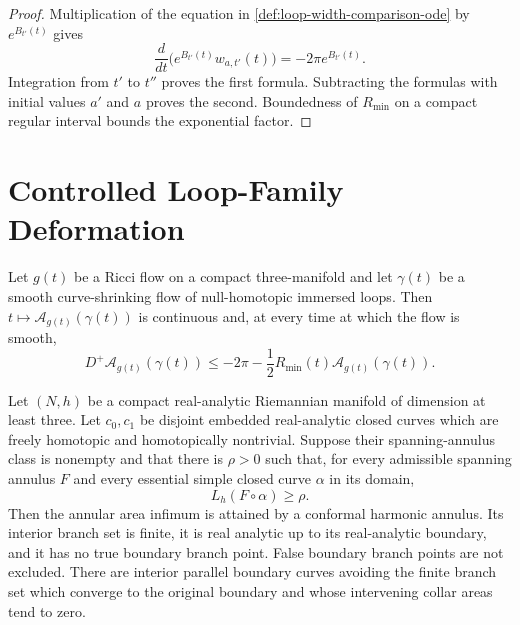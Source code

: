 \begin{proof}
Multiplication of the equation in \ref{def:loop-width-comparison-ode} by
$e^{B_{t'}(t)}$ gives
\[
 \frac d{dt}\bigl(e^{B_{t'}(t)}w_{a,t'}(t)\bigr)
 =-2\pi e^{B_{t'}(t)}.
\]
Integration from $t'$ to $t''$ proves the first formula.  Subtracting the
formulas with initial values $a'$ and $a$ proves the second.  Boundedness of
$R_{\min}$ on a compact regular interval bounds the exponential factor.
\end{proof}
\section{Controlled Loop-Family Deformation}

\begin{theorem}
\label{thm:least-disk-area-variation-interface}
\notready
Let $g(t)$ be a Ricci flow on a compact three-manifold and let
$\gamma(t)$ be a smooth curve-shrinking flow of null-homotopic immersed
loops.  Then $t\mapsto\mathcal A_{g(t)}(\gamma(t))$ is continuous and, at
every time at which the flow is smooth,
\[
 D^+\mathcal A_{g(t)}(\gamma(t))
 \le-2\pi-\frac12R_{\min}(t)
       \mathcal A_{g(t)}(\gamma(t)).
\]
\end{theorem}

\begin{theorem}
\label{thm:annular-douglas-minimizer}
\notready
Let $(N,h)$ be a compact real-analytic Riemannian manifold of dimension at
least three.  Let $c_0,c_1$ be disjoint embedded real-analytic closed curves
which are freely homotopic and homotopically nontrivial.  Suppose their
spanning-annulus class is nonempty and that there is $\rho>0$ such that, for
every admissible spanning annulus $F$ and every essential simple closed curve
$\alpha$ in its domain,
\[
 L_h(F\circ\alpha)\ge\rho.
\]
Then the annular area infimum is attained by a conformal harmonic annulus.
Its interior branch set is finite, it is real analytic up to its real-analytic
boundary, and it has no true boundary branch point.  False boundary branch
points are not excluded.  There are interior parallel boundary curves
avoiding the finite branch set which converge to the original boundary and
whose intervening collar areas tend to zero.
\end{theorem}

